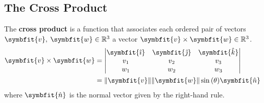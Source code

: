 \documentclass{article}
\begin{document}
\subsection{The Cross Product}
\begin{definition}
    The \textbf{cross product} is a function that associates each
    ordered pair of vectors
    \(\symbfit{v},\: \symbfit{w}\in \mathbb{R}^3\) a vector
    \(\symbfit{v}\times\symbfit{w}\in \mathbb{R}^3\).
    \begin{align*}
        \symbfit{v}\times\symbfit{w} & =
        \begin{vmatrix}
            \symbfit{\hat{\imath}} & \symbfit{\hat{\jmath}} & \symbfit{\hat{k}} \\
            v_1                    & v_2                    & v_3               \\
            w_1                    & w_2                    & w_3
        \end{vmatrix}          \\
                                     & = \norm{\symbfit{v}}\norm{\symbfit{w}}\sin{\left(\theta\right)}\symbfit{\hat{n}}
    \end{align*}
    where \(\symbfit{\hat{n}}\) is the normal vector given by the
    right-hand rule.
\end{definition}
\newpage
\end{document}
